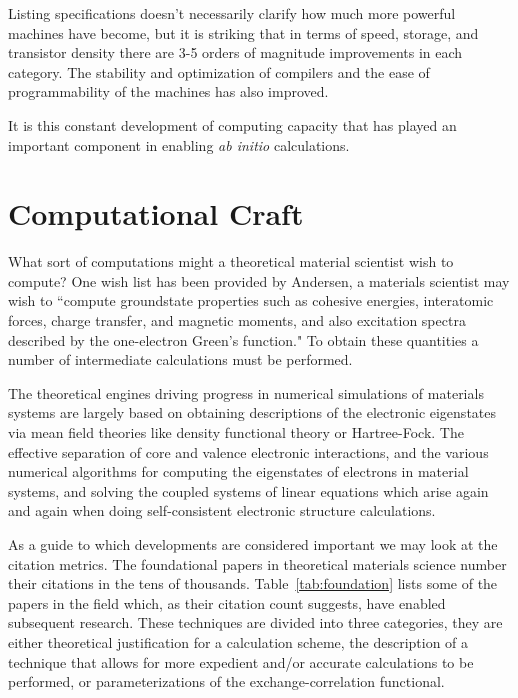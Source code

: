 Listing specifications doesn't necessarily clarify how much more powerful machines have become, 
but it is striking that in terms of speed, storage, and transistor density 
there are 3-5 orders of magnitude improvements in each category. 
The stability and optimization of compilers and the ease of programmability
of the machines has also improved.

It is this constant development of computing capacity that 
has played an important component in enabling {\it ab initio} calculations. 

\section{Computational Craft}
What sort of computations might a theoretical material scientist
wish to compute? One wish list has been provided by Andersen, a materials scientist
may wish to ``compute groundstate properties such as cohesive energies, interatomic forces, 
charge transfer, and magnetic moments, and also excitation spectra described 
by the one-electron Green's function."\cite{anderson75} To obtain these quantities a
number of intermediate calculations must be performed.

The theoretical engines driving progress in numerical simulations of materials systems are
largely based on obtaining descriptions of the electronic eigenstates via mean field theories
like density functional theory or Hartree-Fock. The effective separation
of core and valence electronic interactions, and the various numerical algorithms for 
computing the eigenstates of electrons in material systems, 
and solving the coupled systems of linear equations which arise 
again and again when doing self-consistent electronic structure calculations.

As a guide to which developments are considered important we may
look at the citation metrics. The foundational papers in theoretical materials science
number their citations in the tens of thousands. Table~\ref{tab:foundation} lists some of the papers in the field which, as
their citation count suggests, have enabled subsequent research. These techniques are divided into
three categories, they are either theoretical justification for a calculation scheme, the description of
a technique that allows for more expedient and/or accurate calculations to be performed, 
or parameterizations of the exchange-correlation functional.

